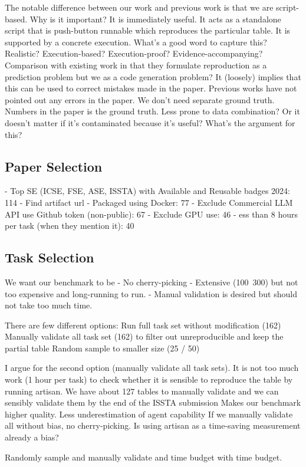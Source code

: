 The notable difference between our work and previous work is that we are script-based. 
Why is it important?
It is immediately useful. It acts as a standalone script that is push-button runnable which reproduces the particular table.
It is supported by a concrete execution.
What’s a good word to capture this? Realistic? Execution-based? Execution-proof? Evidence-accompanying?
Comparison with existing work in that they formulate reproduction as a prediction problem but we as a code generation problem?
It (loosely) implies that this can be used to correct mistakes made in the paper.
Previous works have not pointed out any errors in the paper.
We don’t need separate ground truth. Numbers in the paper is the ground truth.
Less prone to data combination?
Or it doesn’t matter if it’s contaminated because it’s useful?
What’s the argument for this?

\subsection{Paper Selection}
- Top SE (ICSE, FSE, ASE, ISSTA) with Available and Reusable badges 2024: 114
- Find artifact url
- Packaged using Docker: 77
- Exclude Commercial LLM API use Github token (non-public): 67
- Exclude GPU use: 46
- ess than 8 hours per task (when they mention it): 40

\subsection{Task Selection}
We want our benchmark to be 
- No cherry-picking
- Extensive (100~300) but not too expensive and long-running to run.
- Manual validation is desired but should not take too much time.

There are few different options:
Run full task set without modification (162)
Manually validate all task set (162) to filter out unreproducible and keep the partial table
Random sample to smaller size (25 / 50)

I argue for the second option (manually validate all task sets).
It is not too much work (1 hour per task) to check whether it is sensible to reproduce the table by running artisan. 
We have about 127 tables to manually validate and we can sensibly validate them by the end of the ISSTA submission
Makes our benchmark higher quality. Less underestimation of agent capability
If we manually validate all without bias, no cherry-picking.
Is using artisan as a time-saving measurement already a bias?

Randomly sample and manually validate and time budget with time budget.

